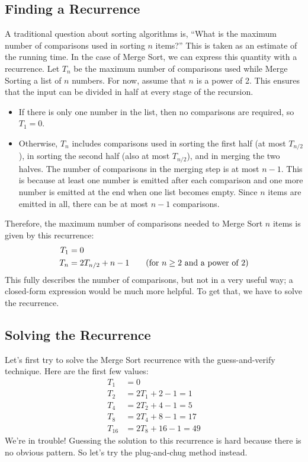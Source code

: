 \subsection{Finding a Recurrence}
A traditional question about sorting algorithms is, ``What is the
maximum number of comparisons used in sorting $n$ items?''  This is
taken as an estimate of the running time.  In the case of Merge Sort,
we can express this quantity with a recurrence.  Let $T_n$ be the
maximum number of comparisons used while Merge Sorting a list of $n$
numbers.  For now, assume that $n$ is a power of 2.  This ensures that
the input can be divided in half at every stage of the recursion.
\begin{itemize}
\item If there is only one number in the list, then no comparisons are
  required, so $T_1 = 0$.
\item Otherwise, $T_n$ includes comparisons used in sorting the first
  half (at most $T_{n/2}$), in sorting the second half (also at most
  $T_{n/2}$), and in merging the two halves.  The number of
  comparisons in the merging step is at most $n - 1$.  This is because
  at least one number is emitted after each comparison and one more
  number is emitted at the end when one list becomes empty.  Since $n$
  items are emitted in all, there can be at most $n - 1$ comparisons.
\end{itemize}
Therefore, the maximum number of comparisons needed to Merge Sort $n$
items is given by this recurrence:
\begin{align*}
T_1 & = 0 \\
T_{n} & = 2 T_{n/2} + n - 1 \text{\qquad (for $n \geq 2$ and a power of 2)}
\end{align*}
This fully describes the number of comparisons, but not in a very
useful way; a closed-form expression would be much more helpful.  To
get that, we have to solve the recurrence.

\subsection{Solving the Recurrence}

Let's first try to solve the Merge Sort recurrence with the
guess-and-verify technique.  Here are the first few values:
\begin{align*}
T_1 & = 0 \\
T_2 & = 2 T_1 + 2 - 1 = 1 \\
T_4 & = 2 T_2 + 4 - 1 = 5 \\
T_8 & = 2 T_4 + 8 - 1 = 17 \\
T_{16} & = 2 T_8 + 16 - 1 = 49
\end{align*}
We're in trouble!  Guessing the solution to this recurrence is hard
because there is no obvious pattern.  So let's try the plug-and-chug
method instead.


